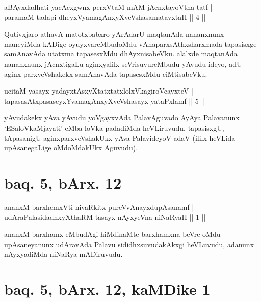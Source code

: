 \begin{shl}
aBAyxdadhati yacAcxgwnx perxVtaM mAM jAcnxtayoV\s tha tatf | \\
paramaM tadapi dheyxVyamagAnxyXveVshasamatavxtaH \hfill ||  4 || 
\end{shl}

\begin{artha}
Qutivxjaro athavA matotxbabxro yArAdarU maqtanAda nananxnunx maneyiMda kADige oyuyxvareMbudoMdu vAnaparxsAthxsharxmada tapasisxge samAnavAda utatxma tapasesxMdu dhAyxnisabeVku. alalxde maqtanAda nananxnunx jAcnxtigaLu aginxyalilx seVrisuvureMbudu yAvudu ideyo, adU aginx parxveVshakekx samAnavAda tapasesxMdu ciMtisabeVku.
\end{artha}

\begin{shl}
ucitaM yasayx yadayxtAsxyXtatxtatxlolxVkagiroVcayxteV | \\
tapasasAtxpasaseyxYvamagAnxyXveVshasayx yataPxlamf \hfill ||  5 || 
\end{shl}

\begin{artha}
yAvudakekx yAva yAvudu yoVgayxvAda PalavAguvado AyAya Palavanunx `ESaloVkaMjayati' eMba loVka padadiMda heVLiruvudu, tapasisxgU, tApasanigU aginxparxveVshakUkx yAva PalavideyoV adaV (ililx heVLida upAsanegaLige oMdoMdakUkx Aguvudu).
\end{artha}

\centerline{}

\section*{baq. 5, bArx. 12}


\begin{shl}
ananxM barxhemxVti nivaRkitx pureVvAnayxdupAsanamf | \\
udAraPalasidadhxyXthaRM tasayx nAyxyeVna niNaRyaH \hfill ||  1 || 
\end{shl}

\begin{artha}
ananxM barxhamx eMbudAgi hiMdinaMte barxhamxna beVre oMdu upAsaneyanunx udAravAda Palavu sididhxsuvudakAkxgi heVLuvudu, adanunx nAyxyadiMda niNaRya mADiruvudu.
\end{artha}

\section*{baq. 5, bArx. 12, kaMDike 1}

